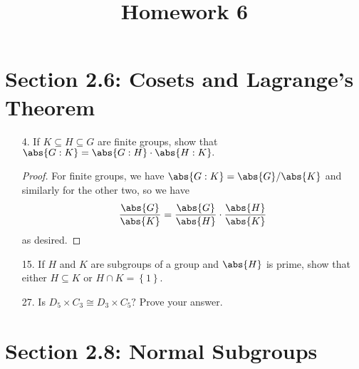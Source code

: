 \documentclass{article}
\begin{document}
\title{Homework 6}
\maketitle
\thispagestyle{fancy}

\section*{Section 2.6: Cosets and Lagrange's Theorem}

\begin{itemize}
	\item[4.] If $K\subseteq H\subseteq G$ are finite groups, show that $\abs{G:K}=\abs{G:H}\cdot\abs{H:K}.$
		\begin{proof}
			For finite groups, we have $\abs{G:K}=\abs{G}/\abs{K}$ and similarly for the other two, so we have \[\frac{\abs{G}}{\abs{K}}=\frac{\abs{G}}{\abs{H}}\cdot\frac{\abs{H}}{\abs{K}}\] as desired.
			
		\end{proof}

	\item[15.] If $H$ and $K$ are subgroups of a group and $\abs{H}$ is prime, show that either $H\subseteq K$ or $H\cap K=\left\{ 1 \right\}.$

	\item[27.] Is $D_5\times C_3\cong D_3\times C_5?$ Prove your answer.
		
\end{itemize}

\section*{Section 2.8: Normal Subgroups}
\end{document}

